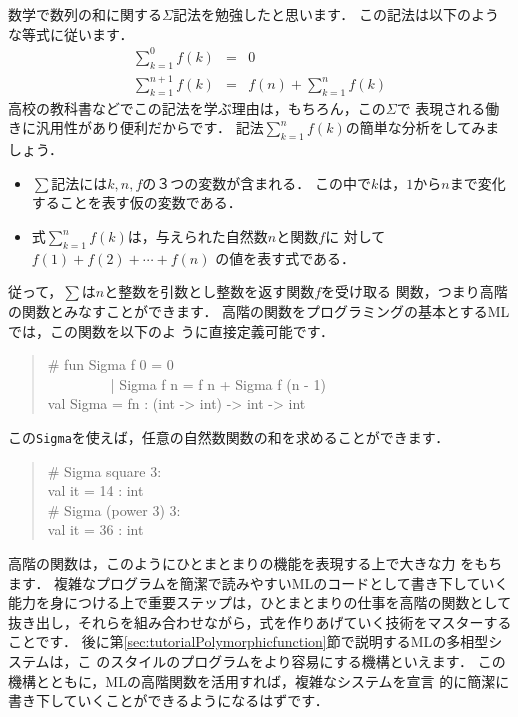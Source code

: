 \documentclass{jbook}
\begin{document}
	数学で数列の和に関する$\Sigma$記法を勉強したと思います．
	この記法は以下のような等式に従います．
\begin{eqnarray*}
\sum_{k=1}^0 f(k) &=& 0\\
\sum_{k=1}^{n+1} f(k) &=& f(n) + \sum_{k=1}^{n} f(k)
\end{eqnarray*}
	高校の教科書などでこの記法を学ぶ理由は，もちろん，この$\Sigma$で
表現される働きに汎用性があり便利だからです．
	記法$\sum_{k=1}^n f(k)$の簡単な分析をしてみましょう．
\begin{itemize}
\item $\sum$記法には$k,n,f$の３つの変数が含まれる．
この中で$k$は，$1$から$n$まで変化することを表す仮の変数である．
\item 式$\sum_{k=1}^n f(k)$は，与えられた自然数$n$と関数$f$に
対して
$
f(1) + f(2) + \cdots + f(n)
$
の値を表す式である．
\end{itemize}
	従って，$\sum$は$n$と整数を引数とし整数を返す関数$f$を受け取る
関数，つまり高階の関数とみなすことができます．
	高階の関数をプログラミングの基本とするMLでは，この関数を以下のよ
うに直接定義可能です．
\begin{tt}
\begin{quote}
\# fun Sigma f 0 = 0\\
\ \ \ \ \ \ \ \ \  | Sigma f n = f n + Sigma f (n - 1)\\
val Sigma = fn : (int -> int) -> int -> int
\end{quote}
\end{tt}
この{\tt Sigma}を使えば，任意の自然数関数の和を求めることができます．
\begin{tt}
\begin{quote}
\# Sigma square 3:\\
val it = 14 : int\\
\# Sigma (power 3) 3:\\
val it = 36 : int
\end{quote}
\end{tt}
	高階の関数は，このようにひとまとまりの機能を表現する上で大きな力
をもちます．
	複雑なプログラムを簡潔で読みやすいMLのコードとして書き下していく
能力を身につける上で重要ステップは，ひとまとまりの仕事を高階の関数として
抜き出し，それらを組み合わせながら，式を作りあげていく技術をマスターする
ことです．
	後に第\ref{sec:tutorialPolymorphicfunction}節で説明するMLの多相型システムは，こ
のスタイルのプログラムをより容易にする機構といえます．
	この機構とともに，MLの高階関数を活用すれば，複雑なシステムを宣言
的に簡潔に書き下していくことができるようになるはずです．
\end{document}
